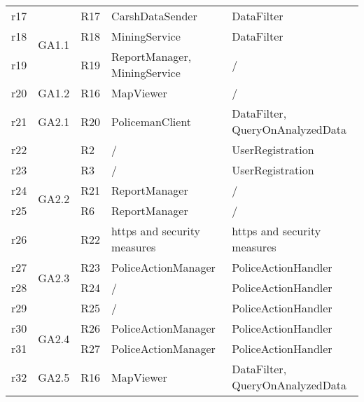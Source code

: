 \begin{table}[h!]
\begin{tabular}{|l|l|l|l|l|}
			r17					&\multirow{3}{*}{GA1.1}	&   	R17 								&  CarshDataSender									&DataFilter\\\cline{3-5}\cline{0-0}
			r18					&											&   	R18 								&  MiningService										&DataFilter\\\cline{3-5}\cline{0-0}
			r19					&											&   	R19 								&  ReportManager, MiningService			&/\\\cline{3-5}\cline{0-0} \hline
											
 			r20					&\multirow{1}{*}{GA1.2}	&   	R16 								&  MapViewer												&/\\\cline{3-5}\cline{0-0} \hline
 	
 			r21					&\multirow{1}{*}{GA2.1}	&   	R20 								& PolicemanClient 										&DataFilter, QueryOnAnalyzedData\\\cline{3-5}\cline{0-0} \hline
 	
 			r22					&\multirow{5}{*}{GA2.2}	&   	R2 								&  /																&UserRegistration\\\cline{3-5}\cline{0-0} 
 			r23					&											& 		R3 								&  /																&UserRegistration\\\cline{3-5}\cline{0-0} 
 			r24					&											&		R21 								&  ReportManager										&/\\\cline{3-5}\cline{0-0}
 			r25					&											&		R6 								&  ReportManager										&/\\\cline{3-5}\cline{0-0}
 			r26					&											&		R22 								&  https and security measures									&https and security measures\\\cline{3-5}\cline{0-0}\hline
 									
 			r27					&\multirow{2}{*}{GA2.3}	&  	R23 								&  PoliceActionManager							&PoliceActionHandler\\\cline{3-5}\cline{0-0}
 			r28					&											&  	R24 								&  /																&PoliceActionHandler\\\cline{3-5}\cline{0-0} 
 			r29					&											&  	R25 								&  /																&PoliceActionHandler\\\cline{3-5}\cline{0-0} \hline
 											
 			r30					&\multirow{2}{*}{GA2.4}	&  	R26 								&  PoliceActionManager										&PoliceActionHandler\\\cline{3-5}\cline{0-0}
 			r31					&											&  	R27 								&  PoliceActionManager							&PoliceActionHandler\\\cline{3-5}\cline{0-0} \hline
 											
 			r32					&\multirow{1}{*}{GA2.5}	&  	R16 								&  MapViewer											&DataFilter, QueryOnAnalyzedData\\\cline{3-5}\cline{0-0}\hline

\end{tabular}
	\end{table}

